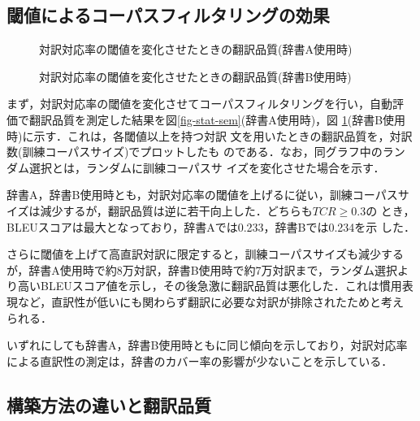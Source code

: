 \subsection{閾値によるコーパスフィルタリングの効果}

\begin{figure}
\begin{center}
\leavevmode\epsfxsize=75mm
\caption{対訳対応率の閾値を変化させたときの翻訳品質(辞書A使用時)}
\label{fig-stat-sem}
\vspace*{2ex}
\leavevmode\epsfxsize=75mm
\caption{対訳対応率の閾値を変化させたときの翻訳品質(辞書B使用時)}
\label{fig-stat-nosem}
\end{center}
\end{figure}

まず，対訳対応率の閾値を変化させてコーパスフィルタリングを行い，自動評
価で翻訳品質を測定した結果を図\ref{fig-stat-sem}(辞書A使用時)，図
\ref{fig-stat-nosem}(辞書B使用時)に示す．これは，各閾値以上を持つ対訳
文を用いたときの翻訳品質を，対訳数(訓練コーパスサイズ)でプロットしたも
のである．なお，同グラフ中のランダム選択とは，ランダムに訓練コーパスサ
イズを変化させた場合を示す．

辞書A，辞書B使用時とも，対訳対応率の閾値を上げるに従い，訓練コーパスサ
イズは減少するが，翻訳品質は逆に若干向上した．どちらも$TCR \geq 0.3$の
とき，BLEUスコアは最大となっており，辞書Aでは0.233，辞書Bでは0.234を示
した．

さらに閾値を上げて高直訳対訳に限定すると，訓練コーパスサイズも減少する
が，辞書A使用時で約8万対訳，辞書B使用時で約7万対訳まで，ランダム選択よ
り高いBLEUスコア値を示し，その後急激に翻訳品質は悪化した．これは慣用表
現など，直訳性が低いにも関わらず翻訳に必要な対訳が排除されたためと考え
られる．

いずれにしても辞書A，辞書B使用時ともに同じ傾向を示しており，対訳対応率
による直訳性の測定は，辞書のカバー率の影響が少ないことを示している．


\subsection{構築方法の違いと翻訳品質}

